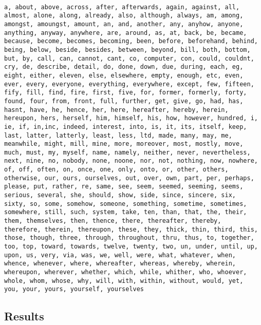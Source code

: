 \begin{verbatim}

a, about, above, across, after, afterwards, again, against, all,
almost, alone, along, already, also, although, always, am, among,
amongst, amoungst, amount, an, and, another, any, anyhow, anyone,
anything, anyway, anywhere, are, around, as, at, back, be, became,
because, become, becomes, becoming, been, before, beforehand, behind,
being, below, beside, besides, between, beyond, bill, both, bottom,
but, by, call, can, cannot, cant, co, computer, con, could, couldnt,
cry, de, describe, detail, do, done, down, due, during, each, eg,
eight, either, eleven, else, elsewhere, empty, enough, etc, even,
ever, every, everyone, everything, everywhere, except, few, fifteen,
fify, fill, find, fire, first, five, for, former, formerly, forty,
found, four, from, front, full, further, get, give, go, had, has,
hasnt, have, he, hence, her, here, hereafter, hereby, herein,
hereupon, hers, herself, him, himself, his, how, however, hundred, i,
ie, if, in,inc, indeed, interest, into, is, it, its, itself, keep,
last, latter, latterly, least, less, ltd, made, many, may, me,
meanwhile, might, mill, mine, more, moreover, most, mostly, move,
much, must, my, myself, name, namely, neither, never, nevertheless,
next, nine, no, nobody, none, noone, nor, not, nothing, now, nowhere,
of, off, often, on, once, one, only, onto, or, other, others,
otherwise, our, ours, ourselves, out, over, own, part, per, perhaps,
please, put, rather, re, same, see, seem, seemed, seeming, seems,
serious, several, she, should, show, side, since, sincere, six,
sixty, so, some, somehow, someone, something, sometime, sometimes,
somewhere, still, such, system, take, ten, than, that, the, their,
them, themselves, then, thence, there, thereafter, thereby,
therefore, therein, thereupon, these, they, thick, thin, third, this,
those, though, three, through, throughout, thru, thus, to, together,
too, top, toward, towards, twelve, twenty, two, un, under, until, up,
upon, us, very, via, was, we, well, were, what, whatever, when,
whence, whenever, where, whereafter, whereas, whereby, wherein,
whereupon, wherever, whether, which, while, whither, who, whoever,
whole, whom, whose, why, will, with, within, without, would, yet,
you, your, yours, yourself, yourselves

\end{verbatim}


\clearpage

\subsection{Results}
\label{sub:Results}

